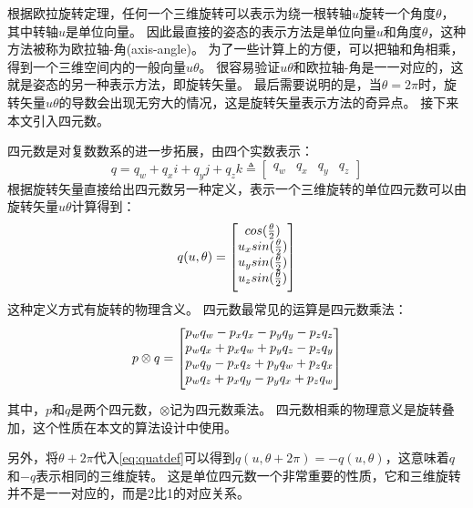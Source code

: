 \documentclass[
  type=master
]{gdutthesis}
\begin{document}
根据欧拉旋转定理，任何一个三维旋转可以表示为绕一根转轴$u$旋转一个角度$\theta$，其中转轴$u$是单位向量\cite{palais2007euler}。
因此最直接的姿态的表示方法是单位向量$u$和角度$\theta$，这种方法被称为欧拉轴-角(axis-angle)。
为了一些计算上的方便，可以把轴和角相乘，得到一个三维空间内的一般向量$u\theta$。
很容易验证$u\theta$和欧拉轴-角是一一对应的，这就是姿态的另一种表示方法，即旋转矢量。
最后需要说明的是，当$\theta = 2\pi$时，旋转矢量$u\theta$的导数会出现无穷大的情况，这是旋转矢量表示方法的奇异点。
接下来本文引入四元数。

四元数是对复数数系的进一步拓展，由四个实数表示：
\begin{equation}\label{eq:quatdef1}
	q = q_w + q_x i + q_y j + q_z k \triangleq 
	\begin{bmatrix}
		q_w & q_x & q_y & q_z
	\end{bmatrix}
\end{equation}
根据旋转矢量直接给出四元数另一种定义，表示一个三维旋转的单位四元数可以由旋转矢量$u\theta$计算得到：
\begin{equation}\label{eq:quatdef}
	q(u,\theta) = 
	\begin{bmatrix}
		cos(\frac{\theta}{2}) \\
		u_x sin(\frac{\theta}{2}) \\
		u_y sin(\frac{\theta}{2}) \\
		u_z sin(\frac{\theta}{2})\vspace{1ex}
	\end{bmatrix}	
\end{equation}
\vspace{1ex}这种定义方式有旋转的物理含义。
四元数最常见的运算是四元数乘法：
\begin{equation}
	p \otimes q = 
	\begin{bmatrix}
		p_w q_w - p_x q_x - p_y q_y - p_z q_z \\
		p_w q_x + p_x q_w + p_y q_z - p_z q_y \\
		p_w q_y - p_x q_z + p_y q_w + p_z q_x \\
		p_w q_z + p_x q_y - p_y q_x + p_z q_w \vspace{1ex}
	\end{bmatrix}	
\end{equation}
其中，$p$和$q$是两个四元数，$\otimes$记为四元数乘法。
四元数相乘的物理意义是旋转叠加，这个性质在本文的算法设计中使用。

另外，将$\theta + 2\pi$代入\autoref{eq:quatdef}可以得到$q(u,\theta + 2\pi)=-q(u,\theta)$，这意味着$q$和$-q$表示相同的三维旋转。
这是单位四元数一个非常重要的性质，它和三维旋转并不是一一对应的，而是2比1的对应关系。
\end{document}
